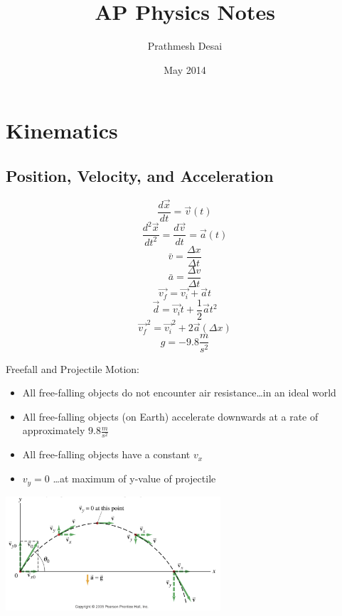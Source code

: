\documentclass{article}
\title{AP Physics Notes}
\author{Prathmesh Desai}
\date{May 2014}
\begin{document}
\maketitle
\tableofcontents
\newpage
\section{Kinematics}
	\subsection{Position, Velocity, and Acceleration}
    	\begin{multicols}{2}
    		\[
            	\frac{d\vec{x}}{dt}=\vec{v}(t)
            \]
    		\[
            	\frac{d^2\vec{x}}{dt^2}=\frac{d\vec{v}}{dt}=\vec{a}(t)
            \]
    		\[
            	\bar{v}=\frac{\Delta{x}}{\Delta{t}}
            \]
    		\[
            	\bar{a}=\frac{\Delta{v}}{\Delta{t}}
            \]
    		\[
            	\vec{v_f}=\vec{v_i}+\vec{a}t
            \]
    		\[
            	\vec{d}=\vec{v_i}t+\frac{1}{2}\vec{a}t^2
            \]
    		\[
            	\vec{v_f}^2=\vec{v_i}^2+2\vec{a}(\Delta{x})
            \]
    		\[
            	g=-9.8\frac{m}{s^2}
            \]
    
    		\columnbreak
    
    		Freefall and Projectile Motion:
    		\vspace{3mm}
    		\begin{itemize}
    			\item All free-falling objects do not encounter air resistance\ldots in an ideal world
    			\item All free-falling objects (on Earth) accelerate downwards at a rate of approximately $9.8\frac{m}{s^2}$
    			\item All free-falling objects have a constant $v_x$
    			\item $v_y=0$ \ldots at maximum of y-value of projectile
    		\end{itemize}
    
    		\vspace{2ex}
    		\includegraphics[width=8cm]{ProjectileMotion.jpg}
    	\end{multicols}
\end{document}
